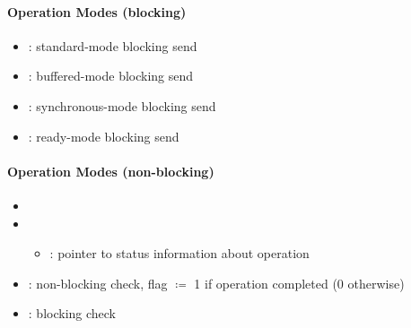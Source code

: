 \paragraph{Operation Modes (blocking)}
\begin{itemize}
  \item {}: standard-mode blocking send
  \item {}: buffered-mode blocking send
  \item {}: synchronous-mode blocking send
  \item {}: ready-mode blocking send
\end{itemize}

\paragraph{Operation Modes (non-blocking)}
\begin{itemize}
  \item {}
  \item {}
  \begin{itemize}
    \item {}: pointer to status information about operation
  \end{itemize}
  \item {}: non-blocking check, flag \( \coloneqq \) 1 if operation completed (0 otherwise)
  \item {}: blocking check
\end{itemize}

